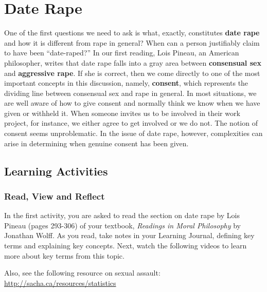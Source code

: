 \documentclass[
]{book}
\begin{document}
\hypertarget{date-rape}{%
\section*{Date Rape}\label{date-rape}}

One of the first questions we need to ask is what, exactly, constitutes \textbf{date rape} and how it is different from rape in general? When can a person justifiably claim to have been ``date-raped?'' In our first reading, Lois Pineau, an American philosopher, writes that date rape falls into a gray area between \textbf{consensual sex} and \textbf{aggressive rape}.
If she is correct, then we come directly to one of the most important concepts in this discussion, namely, \textbf{consent}, which represents the dividing line between consensual sex and rape in general. In most situations, we are well aware of how to give consent and normally think we know when we have given or withheld it. When someone invites us to be involved in their work project, for instance, we either agree to get involved or we do not. The notion of consent seems unproblematic. In the issue of date rape, however, complexities can arise in determining when genuine consent has been given.

\hypertarget{learning-activities-13}{%
\subsection*{Learning Activities}\label{learning-activities-13}}

\begin{reflect}
\hypertarget{read-view-and-reflect-18}{%
\subsubsection*{Read, View and Reflect}\label{read-view-and-reflect-18}}

In the first activity, you are asked to read the section on date rape by Lois
Pineau (pages 293-306) of your textbook, \emph{Readings in Moral Philosophy} by
Jonathan Wolff. As you read, take notes in your Learning Journal, defining key
terms and explaining key concepts.
Next, watch the following videos to learn more about key terms from this topic.

Also, see the following resource on sexual assault:
\url{http://sacha.ca/resources/statistics}
\end{reflect}
\end{document}

